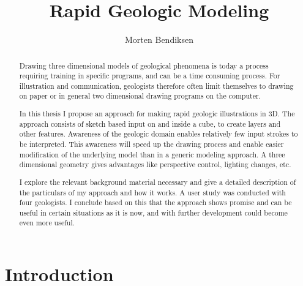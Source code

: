 \documentclass[a4paper,12pt]{report}
\title{Rapid Geologic Modeling}
\author{Morten Bendiksen}
\begin{document}
\maketitle


\clearpage
\begin{abstract}
Drawing three dimensional models of geological phenomena is today a process requiring training in specific programs, and can be a time consuming process. For illustration and communication, geologists therefore often limit themselves to drawing on paper or in general two dimensional drawing programs on the computer.

In this thesis I propose an approach for making rapid geologic illustrations in 3D. The approach consists of sketch based input on and inside a cube, to create layers and other features. Awareness of the geologic domain enables relatively few input strokes to be interpreted. This awareness will speed up the drawing process and enable easier modification of the underlying model than in a generic modeling approach. A three dimensional geometry gives advantages like perspective control, lighting changes, etc.

I explore the relevant background material necessary and give a detailed description of the particulars of my approach and how it works. A user study was conducted with four geologists. I conclude based on this that the approach shows promise and can be useful in certain situations as it is now, and with further development could become even more useful.
\end{abstract}

\clearpage
\tableofcontents 



\clearpage


\chapter{Introduction}
\label{sec:intro}


% 
% 	
% 	
	
\end{document}
